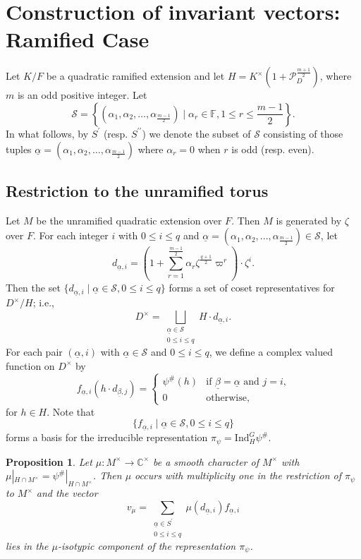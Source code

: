 \documentclass[12pt]{amsart}
\newtheorem{proposition}[theorem]{Proposition}
\theoremstyle{definition}
\theoremstyle{remark}
\begin{document}
\section{Construction of invariant vectors: Ramified Case}\label{ramified}

Let $K/F$ be a quadratic ramified extension and let $H = K^\times (1+\mathcal P_D^{\frac{m+1}{2}})$, where $m$ is an odd positive integer. Let 
\[\mathcal S = \left\{ (\alpha_1, \alpha_2,\dots, \alpha_{\frac{m-1}{2}}) \mid \alpha_r \in \mathbb F, 1 \leq r \leq \frac{m-1}{2} \right\}.\] 
In what follows, by $S^\prime$ (resp. $S^{\prime \prime}$) we denote the subset of $\mathcal{S}$ consisting of those tuples $\underline{\alpha}=(\alpha_1, \alpha_2,\dots,\alpha_{\frac{m-1}{2}})$ where $\alpha_r =0$ when $r$ is odd (resp. even). 

\subsection{Restriction to the unramified torus}

Let $M$ be the unramified quadratic extension over $F$. Then $M$ is generated by $\zeta$ over $F$. For each integer $i$ with $0 \leq i \leq q$ and $\underline{\alpha}=(\alpha_1, \alpha_2,..., \alpha_{\frac{m-1}{2}}) \in \mathcal S$, let
\[d_{\underline{\alpha}, i}= (1 + \sum\limits_{r=1}^{\frac{m-1}{2}} \alpha_r \zeta^{\frac{q+1}{2}} \varpi^r) \cdot \zeta^i.\]
Then the set $\{d_{\underline{\alpha}, i} \mid \underline{\alpha} \in \mathcal S, 0 \leq i \leq q\}$ forms a set of coset representatives for $D^\times/H$; i.e., 
\[D^\times = \bigsqcup_{\substack{\underline{\alpha} \in \mathcal{S}  \\    0 \leq i \leq q }}    H \cdot d_{\underline{\alpha}, i}.\]
For each pair $(\underline{\alpha},i)$ with $\underline{\alpha} \in \mathcal S$ and $0 \leq i \leq q$, we define a complex valued function on $D^\times$ by
\[f_{\underline{\alpha}, i}(h \cdot d_{\underline{\beta}, j}) = \begin{cases}
\psi^\#(h) &\text{if $\underline{\beta} = \underline{\alpha}$ and $j = i$,} \\
0 &\text{otherwise,}
\end{cases} \]
for $h \in H$.
Note that 
\[\{f_{\underline{\alpha}, i} \mid \underline{\alpha} \in \mathcal S, 0 \leq i \leq q \}\] forms a basis for the irreducible representation $\pi_\psi=\mathrm{Ind}^G_{H} \psi^\#$.

\begin{proposition}\label{prop1}
Let $\mu: M^\times \rightarrow \mathbb C^\times$ be a smooth character of $M^\times$ with $\mu|_{H \cap M^\times}=\psi^\#|_{H \cap M^\times}$. Then $\mu$ occurs with multiplicity one in the restriction of $\pi_\psi$ to $M^\times$ and the vector 	
\[v_{\mu}= \sum\limits_{\substack{\underline{\alpha} \in S^\prime  \\    0 \leq i \leq q }} \mu(d_{\underline{\alpha}, i}) f_{\underline{\alpha}, i} \]
lies in the $\mu$-isotypic component of the representation $\pi_\psi$.
\end{proposition}
\end{document}
